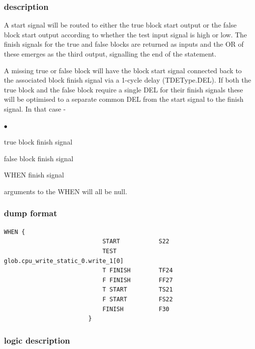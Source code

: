 \documentclass[10pt,a4paper,twoside,fleqn]{book}
\newcommand{\blist}{\begin{list}{$\bullet$}{\setlength{\itemsep}{-5pt}\setlength{\topsep}{-5pt}}}
\newcommand{\blend}{\end{list}}
\begin{document}
                \subsubsection{description}

                    A start signal will be routed to either the true block start
                    output or the false block start output according to whether the
                    test input signal is high or low. The finish signals for the
                    true and false blocks are returned as inputs and the OR of these
                    emerges as the third output, signalling the end of the
                    statement.

                    A missing true or false block will have the block start signal
                    connected back to the associated block finish signal via a
                    1-cycle delay (TDEType.DEL). If both the true block and the
                    false block require a single DEL for their finish signals these
                    will be optimised to a separate common DEL from the start signal
                    to the finish signal. In that case -
                    \blist
                    \item   true block finish signal
                    \item   false block finish signal
                    \item   WHEN finish signal
                    \blend
                    arguments to the WHEN will all be null.

                \subsubsection{dump format}

                    \begin{lstlisting}[gobble=20, language=tde]
                        WHEN {
                            START           S22
                            TEST            glob.cpu_write_static_0.write_1[0]
                            T FINISH        TF24
                            F FINISH        FF27
                            T START         TS21
                            F START         FS22
                            FINISH          F30
                        }
                    \end{lstlisting}

                \subsubsection{logic description}
\end{document}
